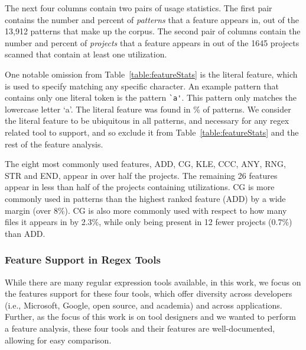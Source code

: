 The next four columns contain two pairs of usage statistics.  The first pair contains the number and percent of \emph{patterns} that a feature appears in, out of the 13,912 patterns that make up the corpus.  The second pair of columns contain the number and percent of \emph{projects} that a feature appears in out of the 1645 projects scanned that contain at least one utilization.

One notable omission from Table~\ref{table:featureStats} is the literal feature, which is used  to specify matching any specific character.  An example pattern that contains only one literal token is the pattern \verb!`a'!.  This pattern only matches the lowercase letter `a'.  The literal feature was found in \% of patterns.
We consider the literal feature to be ubiquitous in all patterns, and necessary for any regex related tool to support, and so exclude it from Table~\ref{table:featureStats} and the rest of the feature analysis.



The eight most commonly used features, ADD, CG, KLE, CCC, ANY, RNG, STR and END,
appear in over half the projects. The remaining 26 features appear in less than half of the projects containing utilizations.
CG is more commonly used in patterns than the highest ranked feature (ADD) by a wide margin (over 8\%).  CG is also more commonly used with respect to how many files it appears in by 2.3\%, while only being present in 12 fewer projects (0.7\%) than ADD.

\subsubsection{Feature Support in Regex Tools}
While there are many regular expression tools available, in this work, we focus on the features support for these four tools, which offer diversity across developers (i.e., Microsoft, Google, open source, and academia) and across applications. Further, as the focus of this work is on tool designers and we wanted to perform a feature analysis, these four tools and their features are well-documented, allowing for easy comparison.

